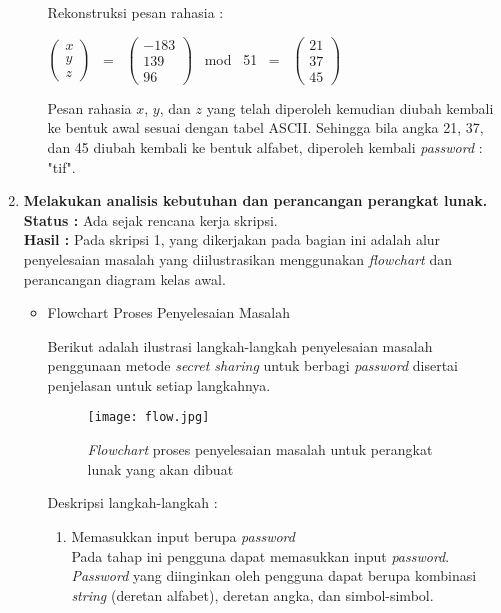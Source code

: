 \documentclass[a4paper,twoside]{article}
\begin{document}
\begin{enumerate}
\begin{itemize}
Rekonstruksi pesan rahasia :
\begin{center}
$\left(
\begin{array}{c}
x \\
y \\
z
\end{array}
\right)$ \ = \ 
$\left(
\begin{array}{c}
-183 \\
139 \\
96
\end{array}
\right)$ \ mod \ 51 \ = \ 
$\left(
\begin{array}{c}
21 \\
37 \\
45
\end{array}
\right)$
\end{center}
\vspace{10pt}
Pesan rahasia $x$, $y$, dan $z$ yang telah diperoleh kemudian diubah kembali ke bentuk awal sesuai dengan tabel ASCII. Sehingga bila angka 21, 37, dan 45 diubah kembali ke bentuk alfabet, diperoleh kembali \textit{password} : "tif".
\end{itemize}
\clearpage

		\item \textbf{Melakukan analisis kebutuhan dan perancangan perangkat lunak.}\\
		{\bf Status :} Ada sejak rencana kerja skripsi.\\
		{\bf Hasil :} Pada skripsi 1, yang dikerjakan pada bagian ini adalah alur penyelesaian masalah yang diilustrasikan menggunakan \textit{flowchart} dan perancangan diagram kelas awal.
		
		\begin{itemize}
		\item Flowchart Proses Penyelesaian Masalah
		
		Berikut adalah ilustrasi langkah-langkah penyelesaian masalah penggunaan metode \textit{secret sharing} untuk berbagi \textit{password} disertai penjelasan untuk setiap langkahnya.
		\begin{figure}[H]
		\centering
		\texttt{[image: flow.jpg]}
			\caption{\textit{Flowchart} proses penyelesaian masalah untuk perangkat lunak yang akan dibuat}
			\label{fig:flow}
		\end{figure}				
		
		Deskripsi langkah-langkah : 

		\begin{enumerate}
		\item Memasukkan input berupa \textit{password} \\
		Pada tahap ini pengguna dapat memasukkan input \textit{password}. \textit{Password} yang diinginkan oleh pengguna dapat berupa kombinasi \textit{string} (deretan alfabet), deretan angka, dan simbol-simbol. \\
		

\end{enumerate}
\end{itemize}
\end{enumerate}
\end{document}
